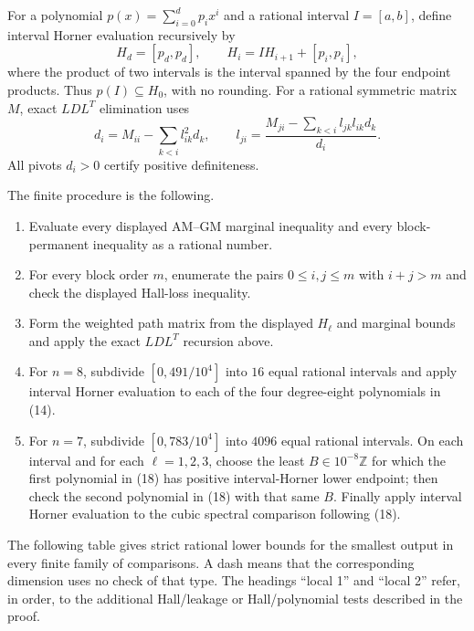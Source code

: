 \documentclass[11pt]{amsart}
\theoremstyle{definition}
\theoremstyle{remark}
\begin{document}
For a polynomial \(p(x)=\sum_{i=0}^d p_ix^i\) and a rational interval
\(I=[a,b]\), define interval Horner evaluation recursively by
\[
 H_d=[p_d,p_d],\qquad H_i=I H_{i+1}+[p_i,p_i],
\]
where the product of two intervals is the interval spanned by the four
endpoint products.  Thus \(p(I)\subseteq H_0\), with no rounding.  For a
rational symmetric matrix \(M\), exact \(LDL^T\) elimination uses
\[
 d_i=M_{ii}-\sum_{k<i}l_{ik}^2d_k,\qquad
 l_{ji}=\frac{M_{ji}-\sum_{k<i}l_{jk}l_{ik}d_k}{d_i}.
\]
All pivots \(d_i>0\) certify positive definiteness.

The finite procedure is the following.

\begin{enumerate}
\item Evaluate every displayed AM--GM marginal inequality and every
  block-permanent inequality as a rational number.
\item For every block order \(m\), enumerate the pairs
  \(0\leq i,j\leq m\) with \(i+j>m\) and check the displayed Hall-loss
  inequality.
\item Form the weighted path matrix from the displayed \(H_\ell\) and
  marginal bounds and apply the exact \(LDL^T\) recursion above.
\item For \(n=8\), subdivide
  \([0,491/10^4]\) into \(16\) equal rational intervals and apply interval
  Horner evaluation to each of the four degree-eight polynomials in
  (14).
\item For \(n=7\), subdivide
  \([0,783/10^4]\) into \(4096\) equal rational intervals.  On each
  interval and for each \(\ell=1,2,3\), choose the least
  \(B\in10^{-8}\mathbb Z\) for which the first polynomial in (18) has
  positive interval-Horner lower endpoint; then check the second
  polynomial in (18) with that same \(B\).  Finally apply interval Horner
  evaluation to the cubic spectral comparison following (18).
\end{enumerate}

The following table gives strict rational lower bounds for the smallest
output in every finite family of comparisons.  A dash means that the
corresponding dimension uses no check of that type.  The headings ``local
1'' and ``local 2'' refer, in order, to the additional Hall/leakage or
Hall/polynomial tests described in the proof.
\end{document}
